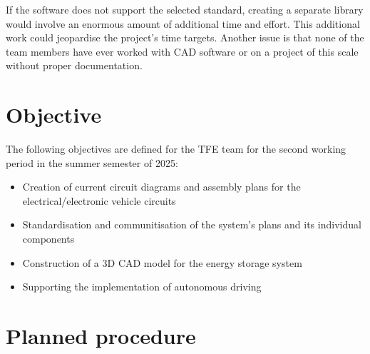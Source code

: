 If the software does not support the selected standard, creating a separate library would involve an enormous amount of additional time and effort. This additional work could jeopardise the project's time targets.
Another issue is that none of the team members have ever worked with CAD software or on a project of this scale without proper documentation.

\section*{Objective}
The following objectives are defined for the \glqq TFE team\grqq{} for the second working period in the summer semester of 2025:
\begin{itemize}
	\item %
	Creation of current circuit diagrams and assembly plans for the \newline  electrical/electronic vehicle circuits
	\item %
	Standardisation and communitisation of the system's plans and its individual components
	\item Construction of a 3D CAD model for the energy storage system
	\item Supporting the implementation of autonomous driving

\end{itemize}
\clearpage

\section*{Planned procedure}

